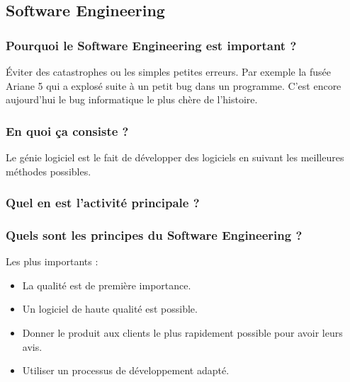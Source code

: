 \subsection{Software Engineering}

\subsubsection{Pourquoi le Software Engineering est important ?}
Éviter des catastrophes ou les simples petites erreurs. Par exemple la fusée Ariane 5 qui a explosé suite à un petit bug dans un programme. C'est encore aujourd'hui
le bug informatique le plus chère de l'histoire.
\subsubsection{En quoi ça consiste ?}
Le génie logiciel est le fait de développer des logiciels en suivant les meilleures méthodes possibles.
\subsubsection{Quel en est l'activité principale ?}
\subsubsection{Quels sont les principes du Software Engineering ?}
Les plus importants :
\begin{itemize}
   \item La qualité est de première importance.
   \item Un logiciel de haute qualité est possible.
   \item Donner le produit aux clients le plus rapidement possible pour avoir leurs avis.
   \item Utiliser un processus de développement adapté.
\end{itemize}
